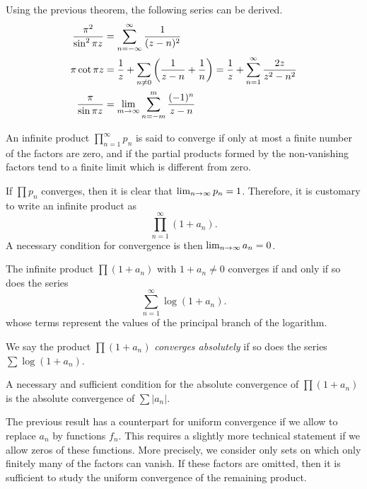 Using the previous theorem, the following series can be derived.
\begin{align*}
  \frac{\pi^2}{\sin^2 \pi z} &= \sum_{n=-\infty}^\infty \frac{1}{(z-n)^2} \\
  \pi \cot \pi z &= \frac{1}{z} + \sum_{n \neq 0} \left( \frac{1}{z-n} + \frac{1}{n} \right) = \frac{1}{z} + \sum_{n=1}^\infty \frac{2 z}{z^2 - n^2} \\
  \frac{\pi}{\sin \pi z} &= \lim_{m \rightarrow \infty} \sum_{n=-m}^m \frac{(-1)^n}{z-n}
\end{align*}

\begin{definition}
  An infinite product $\prod_{n=1}^\infty p_n$ is said to converge if only at most a finite number of the factors are zero, and if the partial products formed by the non-vanishing factors tend to a finite limit which is different from zero.
\end{definition}

If $\prod p_n$ converges, then it is clear that $\lim_{n \rightarrow \infty} p_n = 1$. Therefore, it is customary to write an infinite product as
\[
\prod_{n=1}^\infty (1+a_n).
\]
A necessary condition for convergence is then $\lim_{n \rightarrow \infty} a_n = 0$.

\begin{theorem}
  The infinite product $\prod (1+a_n)$ with $1+a_n \neq 0$ converges if and only if so does the series
  \[
  \sum_{n=1}^\infty \log(1+a_n).
  \]
  whose terms represent the values of the principal branch of the logarithm.
\end{theorem}

\begin{definition}
  We say the product $\prod (1+a_n)$ \emph{converges absolutely} if so does the series $\sum \log(1+a_n)$.
\end{definition}

\begin{theorem}
  A necessary and sufficient condition for the absolute convergence of $\prod (1+a_n)$ is the absolute convergence of $\sum |a_n|$.
\end{theorem}

The previous result has a counterpart for uniform convergence if we allow to replace $a_n$ by functions $f_n$. This requires a slightly more technical statement if we allow zeros of these functions. More precisely, we consider only sets on which only finitely many of the factors can vanish. If these factors are omitted, then it is sufficient to study the uniform convergence of the remaining product.

